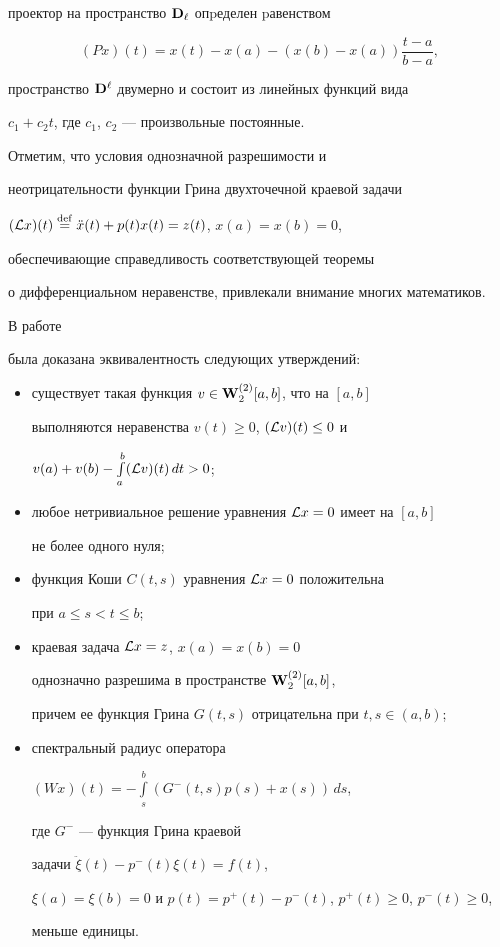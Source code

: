 проектор на пространство $\bold D_\ell$ опpеделен pавенством


$$


(Px)(t)=x(t)-x(a)-(x(b)-x(a))\frac{t-a}{b-a},


$$


пространство $\bold D^\ell$ двумерно и состоит из линейных функций вида


$c_1+c_2t$, где $c_1$, $c_2$ --- произвольные постоянные.





Отметим, что условия однозначной разрешимости и


неотрицательности функции Грина двухточечной краевой задачи


$({\cal L}x)(t)\overset{\mathrm{def}}{=}{}\ddot x(t)+p(t)x(t)=z(t)$, $x(a)=x(b)=0$,


обеспечивающие справедливость соответствующей теоремы


о дифференциальном неравенстве, привлекали внимание многих математиков.


В работе \cite{AD}


была доказана эквивалентность следующих утверждений:


\begin{itemize}


\item[a)] существует такая функция $v\in\bold W_2^{(2)}[a,b]$, что на $[a,b]$


выполняются неравенства $v(t)\ge0$, $({\cal L}v)(t)\le0$ и


$v(a)+v(b)-\int\limits_a^b({\cal L}v)(t)\,dt>0$;


\item[б)] любое нетривиальное решение уравнения ${\cal L}x=0$ имеет на $[a,b]$


не более одного нуля;


\item[в)] функция Коши $C(t,s)$ уравнения ${\cal L}x=0$ положительна


при $a\le s<t\le b$;


\item[г)] краевая задача ${\cal L}x=z$, $x(a)=x(b)=0$


однозначно разрешима в пространстве $\bold W_2^{(2)}[a,b]$,


причем ее функция Грина $G(t,s)$ отрицательна при $t,s\in(a,b)$;


\item[д)] спектральный радиус оператора


$(Wx)(t)=-\int\limits_s^b(G^-(t,s)p(s)+x(s))\,ds$,


где $G^-$ --- функция Грина краевой


задачи $\ddot \xi(t)-p^-(t)\xi(t)=f(t)$,


$\xi(a)=\xi(b)=0$ и $p(t)=p^+(t)-p^-(t)$, $p^+(t)\ge0$, $p^-(t)\ge0$,


меньше единицы.


\end{itemize}





